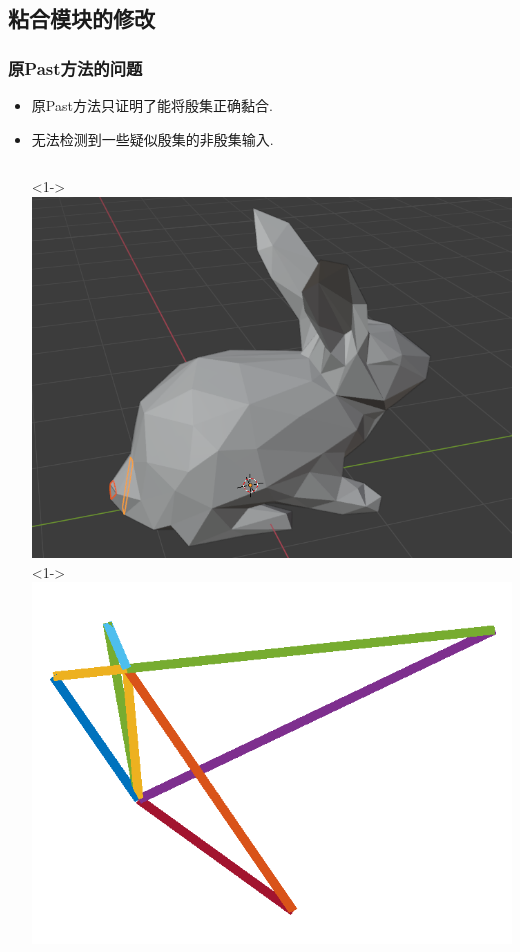 \documentclass[UTF8]{ctexbeamer}	%
\theoremstyle{plain}
\theoremstyle{definition}
\theoremstyle{remark}
\numberwithin{equation}{section}
\begin{document}
\subsection{粘合模块的修改}
\begin{frame}
    \frametitle{原Past方法的问题}
    \begin{itemize}
        \item 原Past方法只证明了能将殷集正确黏合.
        \item 无法检测到一些疑似殷集的非殷集输入.
        \vspace{0.2in}
        \begin{columns}
       <1->
       \includegraphics[width = \textwidth]{fig/rabbit1.png}
       <1->
       \includegraphics[width = \textwidth]{fig/rabbit2.png}
   \end{columns}
    \end{itemize}
\end{frame}
\end{document}
